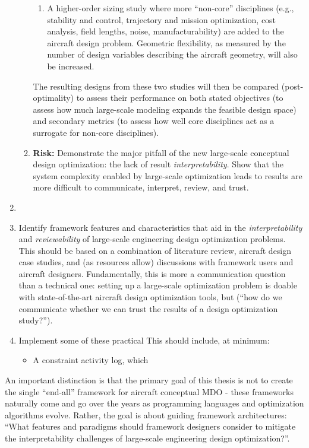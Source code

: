 \documentclass[12pt,vi,twoside]{article}
\begin{document}
\begin{enumerate}
\begin{enumerate}
\begin{enumerate}
                \item A higher-order sizing study where more ``non-core'' disciplines (e.g., stability and control, trajectory and mission optimization, cost analysis, field lengths, noise, manufacturability) are added to the aircraft design problem. Geometric flexibility, as measured by the number of design variables describing the aircraft geometry, will also be increased.
            \end{enumerate}
            The resulting designs from these two studies will then be compared (post-optimality) to assess their performance on both stated objectives (to assess how much large-scale modeling expands the feasible design space) and secondary metrics (to assess how well core disciplines act as a surrogate for non-core disciplines).
            \item \textbf{Risk:} Demonstrate the major pitfall of the new large-scale conceptual design optimization: the lack of result \textit{interpretability}. Show that the system complexity enabled by large-scale optimization leads to results are more difficult to communicate, interpret, review, and trust.
        \end{enumerate}
        \item
        \item Identify framework features and characteristics that aid in the \textit{interpretability} and \textit{reviewability} of large-scale engineering design optimization problems. This should be based on a combination of literature review, aircraft design case studies, and (as resources allow) discussions with framework users and aircraft designers. Fundamentally, this is more a communication question than a technical one: setting up a large-scale optimization problem is doable with state-of-the-art aircraft design optimization tools, but  (``how do we communicate whether we can trust the results of a design optimization study?'').
        \item Implement some of these practical This should include, at minimum:
        \begin{itemize}
            \item A constraint activity log, which
        \end{itemize}
    \end{enumerate}

    An important distinction is that the primary goal of this thesis is not to create the single ``end-all'' framework for aircraft conceptual MDO - these frameworks naturally come and go over the years as programming languages and optimization algorithms evolve. Rather, the goal is about guiding framework architectures: ``What features and paradigms should framework designers consider to mitigate the interpretability challenges of large-scale engineering design optimization?''.
\end{document}
